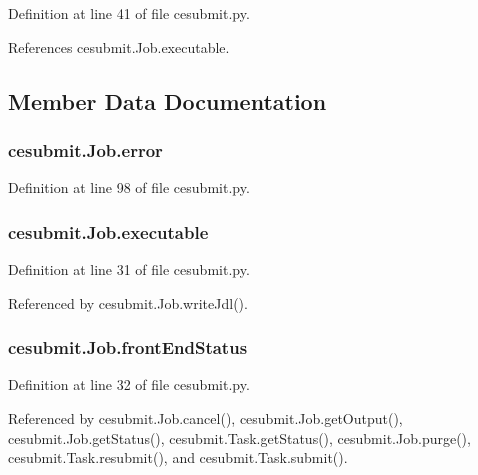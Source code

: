 Definition at line 41 of file cesubmit.\-py.



References cesubmit.\-Job.\-executable.



\subsection{Member Data Documentation}
\subsubsection[{error}]{\setlength{\rightskip}{0pt plus 5cm}cesubmit.\-Job.\-error}\label{classcesubmit_1_1Job_a8631c75a3698ff940214b4a43f9d2ae2}


Definition at line 98 of file cesubmit.\-py.

\subsubsection[{executable}]{\setlength{\rightskip}{0pt plus 5cm}cesubmit.\-Job.\-executable}\label{classcesubmit_1_1Job_a7d04d17b3d5b04fcea30691dcffbe796}


Definition at line 31 of file cesubmit.\-py.



Referenced by cesubmit.\-Job.\-write\-Jdl().

\subsubsection[{front\-End\-Status}]{\setlength{\rightskip}{0pt plus 5cm}cesubmit.\-Job.\-front\-End\-Status}\label{classcesubmit_1_1Job_ab874e04d52ac16aab1a8e14b5a679bae}


Definition at line 32 of file cesubmit.\-py.



Referenced by cesubmit.\-Job.\-cancel(), cesubmit.\-Job.\-get\-Output(), cesubmit.\-Job.\-get\-Status(), cesubmit.\-Task.\-get\-Status(), cesubmit.\-Job.\-purge(), cesubmit.\-Task.\-resubmit(), and cesubmit.\-Task.\-submit().


